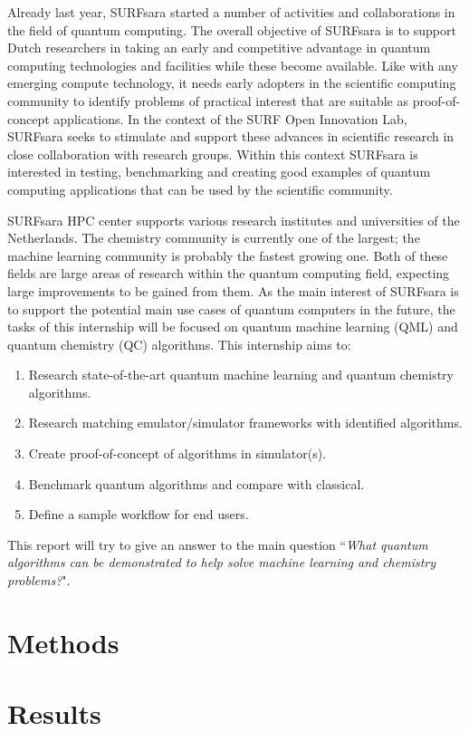 \documentclass[a4paper]{article}
\begin{document}
Already last year, SURFsara started a number of activities and collaborations in the field of quantum computing.
The overall objective of SURFsara is to support Dutch researchers in taking an early and competitive advantage in quantum computing technologies and facilities while these become available.
Like with any  emerging compute technology, it needs early adopters in the scientific computing community to identify problems of practical interest that are suitable as proof-of-concept applications.
In the context of the SURF Open Innovation Lab, SURFsara seeks to stimulate and support these advances in scientific research in close collaboration with research groups.
Within this context SURFsara is interested in testing, benchmarking and creating good examples of quantum computing applications that can be used by the scientific community.

SURFsara HPC center supports various research institutes and universities of the Netherlands.
The chemistry community is currently one of the largest; the machine learning community is probably the fastest growing one.
Both of these fields are large areas of research within the quantum computing field, expecting large improvements to be gained from them.
As the main interest of SURFsara is to support the potential main use cases of quantum computers in the future, the tasks of this internship will be focused on quantum machine learning (QML) and quantum chemistry (QC) algorithms.
This internship aims to:
\begin{enumerate}
	\item Research state-of-the-art quantum machine learning and quantum chemistry algorithms.
	\item Research matching emulator/simulator frameworks with identified algorithms.
	\item Create proof-of-concept of algorithms in simulator(s).
	\item Benchmark quantum algorithms and compare with classical.
	\item Define a sample workflow for end users.
\end{enumerate}

This report will try to give an answer to the main question ``\emph{What quantum algorithms can be demonstrated to help solve machine learning and chemistry problems?}".

\newpage

\section{Methods}

\section{Results}

\newpage

\printbibliography
\end{document}
